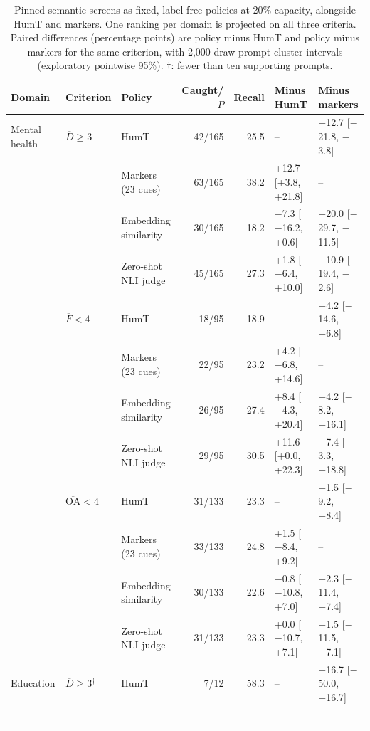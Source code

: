 \begin{table}[t]
\centering\footnotesize
\caption{Pinned semantic screens as fixed, label-free policies at 20\% capacity, alongside HumT and markers. One ranking per domain is projected on all three criteria. Paired differences (percentage points) are policy minus HumT and policy minus markers for the same criterion, with 2,000-draw prompt-cluster intervals (exploratory pointwise 95\%). $\dagger$: fewer than ten supporting prompts.}
\label{tab:semantic_fixed}
\begin{tabular}{lllrrll}
\toprule
Domain & Criterion & Policy & Caught/$P$ & Recall & Minus HumT & Minus markers \\
\midrule
Mental health & $\overline D\geq3$ & HumT & 42/165 & 25.5 & -- & \ensuremath{-}12.7 [\ensuremath{-}21.8, \ensuremath{-}3.8] \\
 &  & Markers (23 cues) & 63/165 & 38.2 & +12.7 [+3.8, +21.8] & -- \\
 &  & Embedding similarity & 30/165 & 18.2 & \ensuremath{-}7.3 [\ensuremath{-}16.2, +0.6] & \ensuremath{-}20.0 [\ensuremath{-}29.7, \ensuremath{-}11.5] \\
 &  & Zero-shot NLI judge & 45/165 & 27.3 & +1.8 [\ensuremath{-}6.4, +10.0] & \ensuremath{-}10.9 [\ensuremath{-}19.4, \ensuremath{-}2.6] \\
\addlinespace
 & $\overline F<4$ & HumT & 18/95 & 18.9 & -- & \ensuremath{-}4.2 [\ensuremath{-}14.6, +6.8] \\
 &  & Markers (23 cues) & 22/95 & 23.2 & +4.2 [\ensuremath{-}6.8, +14.6] & -- \\
 &  & Embedding similarity & 26/95 & 27.4 & +8.4 [\ensuremath{-}4.3, +20.4] & +4.2 [\ensuremath{-}8.2, +16.1] \\
 &  & Zero-shot NLI judge & 29/95 & 30.5 & +11.6 [+0.0, +22.3] & +7.4 [\ensuremath{-}3.3, +18.8] \\
\addlinespace
 & $\overline{\mathrm{OA}}<4$ & HumT & 31/133 & 23.3 & -- & \ensuremath{-}1.5 [\ensuremath{-}9.2, +8.4] \\
 &  & Markers (23 cues) & 33/133 & 24.8 & +1.5 [\ensuremath{-}8.4, +9.2] & -- \\
 &  & Embedding similarity & 30/133 & 22.6 & \ensuremath{-}0.8 [\ensuremath{-}10.8, +7.0] & \ensuremath{-}2.3 [\ensuremath{-}11.4, +7.4] \\
 &  & Zero-shot NLI judge & 31/133 & 23.3 & +0.0 [\ensuremath{-}10.7, +7.1] & \ensuremath{-}1.5 [\ensuremath{-}11.5, +7.1] \\
\addlinespace
Education & $\overline D\geq3$$^{\dagger}$ & HumT & 7/12 & 58.3 & -- & \ensuremath{-}16.7 [\ensuremath{-}50.0, +16.7] \\
$$
\end{tabular}
\end{table}

